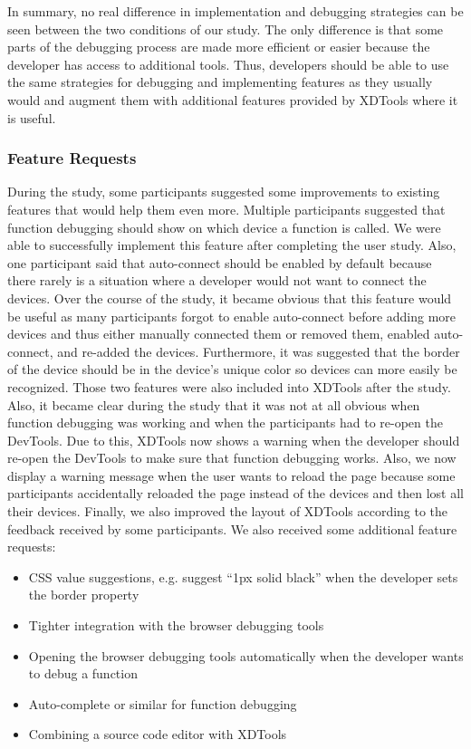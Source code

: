 In summary, no real difference in implementation and debugging strategies can be seen between the two conditions of our study. The only difference is that some parts of the debugging process are made more efficient or easier because the developer has access to additional tools. Thus, developers should be able to use the same strategies for debugging and implementing features as they usually would and augment them with additional features provided by XDTools where it is useful. 

\subsubsection{Feature Requests}

During the study, some participants suggested some improvements to existing features that would help them even more. Multiple participants suggested that function debugging should show on which device a function is called. We were able to successfully implement this feature after completing the user study. Also, one participant said that auto-connect should be enabled by default because there rarely is a situation where a developer would not want to connect the devices. Over the course of the study, it became obvious that this feature would be useful as many participants forgot to enable auto-connect before adding more devices and thus either manually connected them or removed them, enabled auto-connect, and re-added the devices. Furthermore, it was suggested that the border of the device should be in the device's unique color so devices can more easily be recognized. Those two features were also included into XDTools after the study. Also, it became clear during the study that it was not at all obvious when function debugging was working and when the participants had to re-open the DevTools. Due to this, XDTools now shows a warning when the developer should re-open the DevTools to make sure that function debugging works. Also, we now display a warning message when the user wants to reload the page because some participants accidentally reloaded the page instead of the devices and then lost all their devices. Finally, we also improved the layout of XDTools according to the feedback received by some participants. We also received some additional feature requests:
\begin{itemize}
	\item CSS value suggestions, e.g. suggest ``1px solid black'' when the developer sets the border property
	\item Tighter integration with the browser debugging tools
	\item Opening the browser debugging tools automatically when the developer wants to debug a function
	\item Auto-complete or similar for function debugging
	\item Combining a source code editor with XDTools
\end{itemize}
